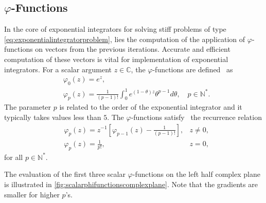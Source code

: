\subsection{\texorpdfstring{$\varphi$}{Phi}-Functions}
In the core of exponential integrators for solving stiff problems of type
\eqref{eq:exponentialintegratorproblem}, lies the computation of the application of
$\varphi$-functions on vectors from the previous iterations. Accurate and efficient computation of
these vectors is vital for implementation of exponential integrators.
For a scalar argument $z \in \mathbb{C}$, the $\varphi$-functions are
defined~\cite{higham2008functions} as
\begin{equation}
    \label{eq:scalarphifunctionsdefinition}
    \begin{aligned}
        & \varphi_0(z) = e^z,\\
        & \varphi_p(z) = \frac{1}{(p-1)!} \int_{0}^{1}{e^{(1 - \theta)z} \theta^{p-1} d\theta},
        \quad p \in \mathbb{N^*}.
    \end{aligned}
\end{equation}
The parameter $p$ is related to the order of the exponential integrator and it typically takes
values less than $5$.
The $\varphi$-functions satisfy~\cite{higham2008functions} the recurrence relation
\begin{equation}
    \label{eq:scalarphifunctionsrecurrence}
    \begin{aligned}
        & \varphi_p(z) = z^{-1} \left[ \varphi_{p-1}(z) - \frac{1}{(p-1)!} \right] ,
        & z \neq 0,
        \\
        & \varphi_p(z) = \frac{1}{p!},
        & z = 0,
    \end{aligned}
\end{equation}
for all $p \in \mathbb{N^*}$.

The evaluation of the first three scalar $\varphi$-functions on the left half complex plane
is illustrated in \autoref{fig:scalarphifunctionscomplexplane}. Note that the gradients are
smaller for higher $p$'s.

